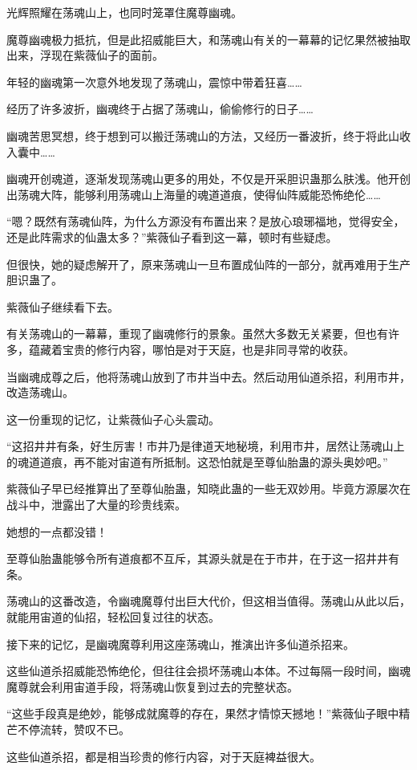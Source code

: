 \begin{this_body}
光辉照耀在荡魂山上，也同时笼罩住魔尊幽魂。

魔尊幽魂极力抵抗，但是此招威能巨大，和荡魂山有关的一幕幕的记忆果然被抽取出来，浮现在紫薇仙子的面前。

年轻的幽魂第一次意外地发现了荡魂山，震惊中带着狂喜……

经历了许多波折，幽魂终于占据了荡魂山，偷偷修行的日子……

幽魂苦思冥想，终于想到可以搬迁荡魂山的方法，又经历一番波折，终于将此山收入囊中……

幽魂开创魂道，逐渐发现荡魂山更多的用处，不仅是开采胆识蛊那么肤浅。他开创出荡魂大阵，能够利用荡魂山上海量的魂道道痕，使得仙阵威能恐怖绝伦……

“嗯？既然有荡魂仙阵，为什么方源没有布置出来？是放心琅琊福地，觉得安全，还是此阵需求的仙蛊太多？”紫薇仙子看到这一幕，顿时有些疑虑。

但很快，她的疑虑解开了，原来荡魂山一旦布置成仙阵的一部分，就再难用于生产胆识蛊了。

紫薇仙子继续看下去。

有关荡魂山的一幕幕，重现了幽魂修行的景象。虽然大多数无关紧要，但也有许多，蕴藏着宝贵的修行内容，哪怕是对于天庭，也是非同寻常的收获。

当幽魂成尊之后，他将荡魂山放到了市井当中去。然后动用仙道杀招，利用市井，改造荡魂山。

这一份重现的记忆，让紫薇仙子心头震动。

“这招井井有条，好生厉害！市井乃是律道天地秘境，利用市井，居然让荡魂山上的魂道道痕，再不能对宙道有所抵制。这恐怕就是至尊仙胎蛊的源头奥妙吧。”

紫薇仙子早已经推算出了至尊仙胎蛊，知晓此蛊的一些无双妙用。毕竟方源屡次在战斗中，泄露出了大量的珍贵线索。

她想的一点都没错！

至尊仙胎蛊能够令所有道痕都不互斥，其源头就是在于市井，在于这一招井井有条。

荡魂山的这番改造，令幽魂魔尊付出巨大代价，但这相当值得。荡魂山从此以后，就能用宙道的仙招，轻松回复过往的状态。

接下来的记忆，是幽魂魔尊利用这座荡魂山，推演出许多仙道杀招来。

这些仙道杀招威能恐怖绝伦，但往往会损坏荡魂山本体。不过每隔一段时间，幽魂魔尊就会利用宙道手段，将荡魂山恢复到过去的完整状态。

“这些手段真是绝妙，能够成就魔尊的存在，果然才情惊天撼地！”紫薇仙子眼中精芒不停流转，赞叹不已。

这些仙道杀招，都是相当珍贵的修行内容，对于天庭裨益很大。


\end{this_body}
